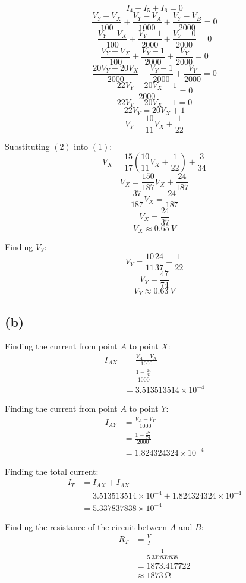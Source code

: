 \documentclass[11pt]{article}
\begin{document}
\newpage

\[I_4 + I_5 + I_6 = 0\]
\[\frac{V_Y - V_X}{100} + \frac{V_Y - V_A}{1000} + \frac{V_Y - V_B}{2000} = 0\]
\[\frac{V_Y - V_X}{100} + \frac{V_Y - 1}{2000} + \frac{V_Y - 0}{2000} = 0\]
\[\frac{V_Y - V_X}{100} + \frac{V_Y - 1}{2000} + \frac{V_Y}{2000} = 0\]
\[\frac{20V_Y - 20V_X}{2000} + \frac{V_Y - 1}{2000} + \frac{V_Y}{2000} = 0\]
\[\frac{22V_Y - 20V_X - 1}{2000} = 0\]
\[22V_Y - 20V_X - 1 = 0\]
\[22V_Y = 20V_X + 1\]
\[V_Y = \frac{10}{11} V_X + \frac{1}{22} \tag{2}\]

Substituting \((2)\) into \((1)\):
\[V_X = \frac{15}{17} \left( \frac{10}{11} V_X + \frac{1}{22} \right) + \frac{3}{34}\]
\[V_X = \frac{150}{187}V_X + \frac{24}{187}\]
\[\frac{37}{187}V_X = \frac{24}{187}\]
\[V_X = \frac{24}{37}\]
\[V_X \approx \qty{0.65}{\unit{V}} \tag{3}\]

Finding \(V_Y\):
\[V_Y = \frac{10}{11} \frac{24}{37} + \frac{1}{22}\]
\[V_Y = \frac{47}{74}\]
\[V_Y \approx \qty{0.63}{\unit{V}}\]

\subsection{(b)}
\label{sec:orgf3134c8}
Finding the current from point \(A\) to point \(X\):
\begin{align*}
I_{AX} &= \frac{V_A - V_X}{1000} \\
&= \frac{1 - \frac{24}{37}}{1000} \\
&= 3.513513514 \times 10^{-4}
\end{align*}

Finding the current from point \(A\) to point \(Y\):
\begin{align*}
I_{AY} &= \frac{V_A - V_Y}{1000} \\
&= \frac{1 - \frac{47}{74}}{2000} \\
&= 1.824324324 \times 10^{-4}
\end{align*}

Finding the total current:
\begin{align*}
I_{T} &= I_{AX} + I_{AX} \\
&= 3.513513514 \times 10^{-4} + 1.824324324 \times 10^{-4} \\
&= 5.337837838 \times 10^{-4}
\end{align*}

Finding the resistance of the circuit between \(A\) and \(B\):
\begin{align*}
R_{T} &= \frac{V}{I} \\
&= \frac{1}{5.337837838} \\
&= 1873.417722 \\
&\approx \qty{1873}{\unit{\ohm}}
\end{align*}
\end{document}
